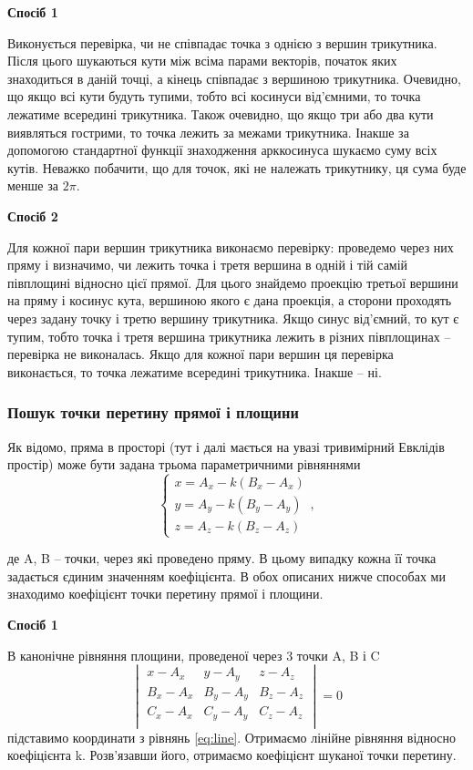\documentclass[a4paper,12pt]{article}
\begin{document}
\textbf{Спосіб 1}

 Виконується перевірка, чи не співпадає точка з однією з вершин трикутника. Після цього шукаються кути між всіма парами векторів, початок яких знаходиться в даній точці, а кінець співпадає з вершиною трикутника. Очевидно, що якщо всі кути будуть тупими, тобто всі косинуси від’ємними, то точка лежатиме всередині трикутника. Також очевидно, що якщо три або два кути виявляться гострими, то точка лежить за межами трикутника. Інакше за допомогою стандартної функції знаходження арккосинуса шукаємо суму всіх кутів. Неважко побачити, що для точок, які не належать трикутнику, ця сума буде менше за $2\pi$.

\textbf{Спосіб 2}

 Для кожної пари вершин трикутника виконаємо перевірку: проведемо через них пряму і визначимо, чи лежить точка і третя вершина в одній і тій самій півплощині відносно цієї прямої. Для цього знайдемо проекцію третьої вершини на пряму і косинус кута, вершиною якого є дана проекція, а сторони проходять через задану точку і третю вершину трикутника. Якщо синус від’ємний, то кут є тупим, тобто точка і третя вершина трикутника лежить в різних півплощинах -- перевірка не виконалась. Якщо для кожної пари вершин ця перевірка виконається, то точка лежатиме всередині трикутника. Інакше -- ні.

\subsubsection{Пошук точки перетину прямої і площини} \label{sec:intersections}
Як відомо, пряма в просторі (тут і далі мається на увазі тривимірний Евклідів простір) може бути задана трьома параметричними рівняннями
\begin{equation} \label{eq:line}
  \begin{cases}
    x = A_x - k(B_x - A_x) \\
    y = A_y - k(B_y - A_y) \\
    z = A_z - k(B_z - A_z)
  \end{cases},
\end{equation}

де A, B -- точки, через які проведено пряму. В цьому випадку кожна її точка задається єдиним значенням коефіцієнта. В обох описаних нижче способах ми знаходимо коефіцієнт точки перетину прямої і площини.

\textbf{Спосіб 1}

В канонічне рівняння площини, проведеної через 3 точки A, B і C
\begin{equation} \label{eq:plane}
  \begin{vmatrix}
    x - A_x & y - A_y & z - A_z \\
    B_x - A_x & B_y - A_y & B_z - A_z \\
    C_x - A_x & C_y - A_y & C_z - A_z \\
  \end{vmatrix} = 0
\end{equation}
підставимо координати з рівнянь \ref{eq:line}. Отримаємо лінійне рівняння відносно коефіцієнта k. Розв’язавши його, отримаємо коефіцієнт шуканої точки перетину.
\end{document}
